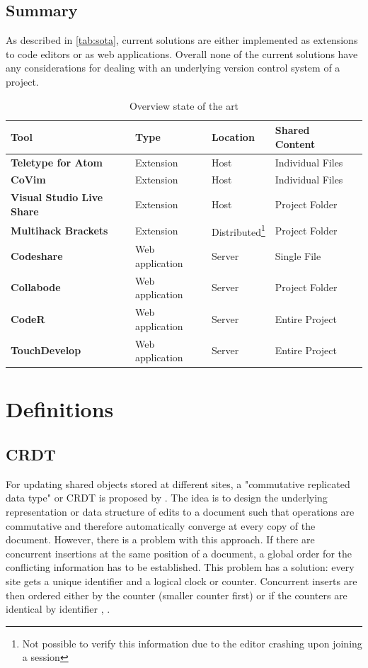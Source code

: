 \newpage
\subsection{Summary}
As described in \autoref{tab:sota}, current solutions are either implemented as extensions to code editors or as web applications. Overall none of the current solutions have any considerations for dealing with an underlying version control system of a project.
\begin{table}
	\begin{minipage}{6cm}
		\begin{tabular}{| >{\bfseries}l | l | l | l | l | }
			\hline
				\rowcolor{orange} \bfseries Tool & \bfseries Type & \bfseries Location & \bfseries Shared Content \\
			\hline
			\hline
				Teletype for Atom & Extension & Host & Individual Files \\\hline
				CoVim & Extension & Host & Individual Files \\\hline
				Visual Studio Live Share & Extension & Host & Project Folder \\\hline
				Multihack Brackets & Extension &  Distributed\footnote{Not possible to verify this information due to the editor crashing upon joining a session} & Project Folder \\\hline
				Codeshare & Web application & Server & Single File \\\hline
				Collabode & Web application & Server & Project Folder \\\hline
				CodeR & Web application & Server & Entire Project \\\hline
				TouchDevelop & Web application & Server & Entire Project \\
			\hline
		\end{tabular}
	\end{minipage}
		\caption{Overview state of the art}
		\label{tab:sota}
	\end{table}

\section{Definitions}

\subsection{CRDT}
\label{sec:CRDT}
For updating shared objects stored at different sites, a "commutative replicated data type" or CRDT is proposed by \cite{PreguicaMarquesShapiroLetia:2009}. The idea is to design the underlying representation or data structure of edits to a document such that operations are commutative and therefore automatically converge at every copy of the document.
However, there is a problem with this approach. If there are concurrent insertions at the same position of a document, a global order for the conflicting information has to be established. This problem has a solution: every site gets a unique identifier and a logical clock or counter. Concurrent inserts are then ordered either by the counter (smaller counter first) or if the counters are identical by identifier \cite{PreguicaMarquesShapiroLetia:2009}, \cite{Oster:2006:DataconsistencyforP2Pcollaborativeediting}.

